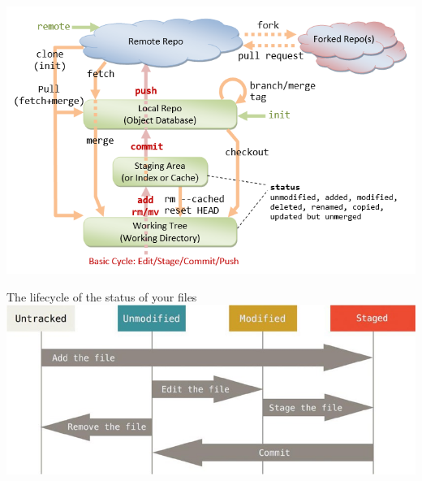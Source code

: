 \documentclass[xcolor=x11names,compress]{beamer}
\renewcommand{\(}{\begin{columns}}
\renewcommand{\)}{\end{columns}}
\newcommand{\<}[1]{\begin{column}{#1}}
\renewcommand{\>}{\end{column}}
\begin{document}
\begin{frame}
	\includegraphics[width = \textwidth,height = 0.7\textheight]{s11.png}
\end{frame}

\begin{frame}{The lifecycle of the status of your files}
	\includegraphics[width = \textwidth,height = 0.5\textheight]{s9.png}
\end{frame}
\end{document}
